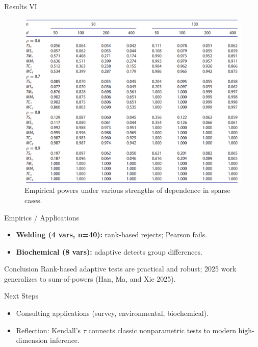 \documentclass[
  ignorenonframetext,
]{beamer}
\providecommand{\tightlist}{%
  \setlength{\itemsep}{0pt}\setlength{\parskip}{0pt}}
\begin{document}
\begin{frame}{Results VI}
\label{results-vi}
\begin{figure}

{\centering \includegraphics[width=0.8\linewidth]{Figures/Table5} 

}

\caption{Empirical powers under various strengths of dependence in sparse cases.}\label{fig:Table 5}
\end{figure}

\begin{block}{Empirics / Applications}
\label{empirics-applications}
\begin{itemize}
\tightlist
\item
  \textbf{Welding (4 vars, n=40):} rank-based rejects; Pearson fails.
\item
  \textbf{Biochemical (8 vars):} adaptive detects group differences.
\end{itemize}
\end{block}
\end{frame}

\begin{frame}{Conclusion}
\label{conclusion}
Rank-based adaptive tests are practical and robust; 2025 work
generalizes to sum-of-powers (Han, Ma, and Xie 2025).
\end{frame}

\begin{frame}{Next Steps}
\label{next-steps}
\begin{itemize}
\tightlist
\item
  Consulting applications (survey, environmental, biochemical).
\item
  Reflection: Kendall's \(\tau\) connects classic nonparametric tests to
  modern high-dimension inference.
\end{itemize}
\end{frame}
\end{document}
